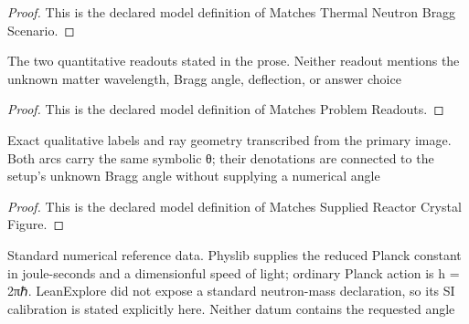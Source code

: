 \begin{proof}
  This is the declared model definition of Matches Thermal Neutron Bragg Scenario.
\end{proof}
\begin{definition}
  \label{def:physics:phyx-mini-0557:phyxminiproblems-problemphyxmini0557-matchesproblemreadouts}
  The two quantitative readouts stated in the prose. Neither readout mentions the unknown matter wavelength, Bragg angle, deflection, or answer choice
\end{definition}
\begin{proof}
  This is the declared model definition of Matches Problem Readouts.
\end{proof}
\begin{definition}
  \label{def:physics:phyx-mini-0557:phyxminiproblems-problemphyxmini0557-matchessuppliedreactorcrystalfigure}
  Exact qualitative labels and ray geometry transcribed from the primary image. Both arcs carry the same symbolic θ; their denotations are connected to the setup's unknown Bragg angle without supplying a numerical angle
\end{definition}
\begin{proof}
  This is the declared model definition of Matches Supplied Reactor Crystal Figure.
\end{proof}
\begin{definition}
  \label{def:physics:phyx-mini-0557:phyxminiproblems-problemphyxmini0557-usesstandardneutronreferencedata}
  Standard numerical reference data. Physlib supplies the reduced Planck constant in joule-seconds and a dimensionful speed of light; ordinary Planck action is h = 2πℏ. LeanExplore did not expose a standard neutron-mass declaration, so its SI calibration is stated explicitly here. Neither datum contains the requested angle
\end{definition}
